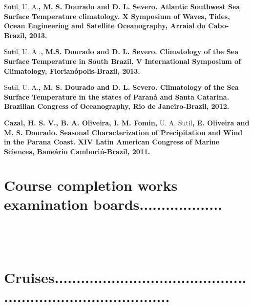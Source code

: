 \documentclass[letterpaper]{twentysecondcv} %
\begin{document}
Sutil, U. A.\textbf{, M. S. Dourado and  D. L. Severo. Atlantic Southwest Sea Surface Temperature climatology. X Symposium of Waves, Tides, Ocean Engineering and Satellite Oceanography, Arraial do Cabo-Brazil, 2013.}

\newpage
\makeprofile

Sutil, U. A .\textbf{, M.S. Dourado and D. L. Severo. Climatology of the Sea Surface Temperature in South Brazil. V International Symposium of Climatology, Florianópolis-Brazil, 2013.}

Sutil, U. A.\textbf{, M. S. Dourado and D. L. Severo. Climatology of the Sea Surface Temperature in the states of Paraná and Santa Catarina. Brazilian Congress of Oceanography,  Rio de Janeiro-Brazil, 2012.}

\textbf{Cazal, H. S. V., B. A. Oliveira, I. M. Fomin,} U. A. Sutil\textbf{, E. Oliveira and M. S. Dourado. Seasonal Characterization of Precipitation and Wind in the Parana Coast. XIV Latin American Congress of Marine Sciences, Baneário Camboriú-Brazil, 2011.}\\

\section{Course completion works examination boards\textcolor{maingray}{...................}}


\begin{twentyshort}
	\\
\end{twentyshort}
\\
\section{Cruises\textcolor{mainblue}{..................................................................................}}
\end{document}
